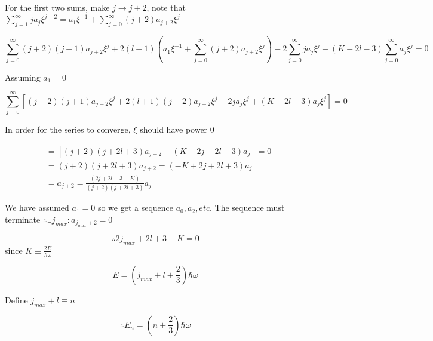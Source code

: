 \documentclass[a4paper,15pt]{article}
\begin{document}
For the first two sums, make \(j \to j+2\), note that \(\sum_{j=1}^\infty j a_j
\xi^{j-2}=a_1\xi^{-1}+\sum_{j=0}^\infty
(j+2) a_{j+2}\xi^{j}\)

\[
\sum_{j=0}^\infty (j+2)(j+1) a_{j+2}\xi^{j}+2(l+1)\left(a_1\xi^{-1}+\sum_{j=0}^\infty
(j+2) a_{j+2}\xi^{j}\right)-2\sum_{j=0}^\infty j a_j\xi^{j}+(K-2l-3)\sum_{j=0}^\infty
 a_j\xi^{j} = 0
\]

Assuming \(a_1 = 0\)

\[
\sum_{j=0}^\infty [(j+2)(j+1) a_{j+2}\xi^{j}+2(l+1)(j+2) a_{j+2}\xi^{j}- 2j a_j
\xi^{j}+(K-2l-3)a_j\xi^{j}] = 0
\]

In order for the series to converge, \(\xi\) should have power 0

\begin{align}
  &=[(j+2)(j+2l+3)a_{j+2}+(K-2j-2l-3)a_j]=0 \nonumber \\
  &=(j+2)(j+2l+3)a_{j+2}=(-K+2j+2l+3)a_j \nonumber \\
  &=\boxed{a_{j+2}=\frac{(2j+2l+3-K)}{(j+2)(j+2l+3)} a_j}
\end{align}

We have assumed \(a_1 = 0\) so we get a sequence \(a_0, a_2, etc\). The sequence
must terminate \(\therefore \exists j_{max}: a_{j_{max}+2}=0\)

\[
\therefore 2j_{max} + 2l + 3 -K =0
\]
since \(K \equiv \frac{2E}{\hbar \omega}\)

\[
E=\left(j_{max}+l+\frac{2}{3}\right)\hbar \omega
\]

Define \(j_{max}+l \equiv n \)

\[
\therefore E_n=\left(n+\frac{2}{3}\right)\hbar \omega
\]
\end{document}
